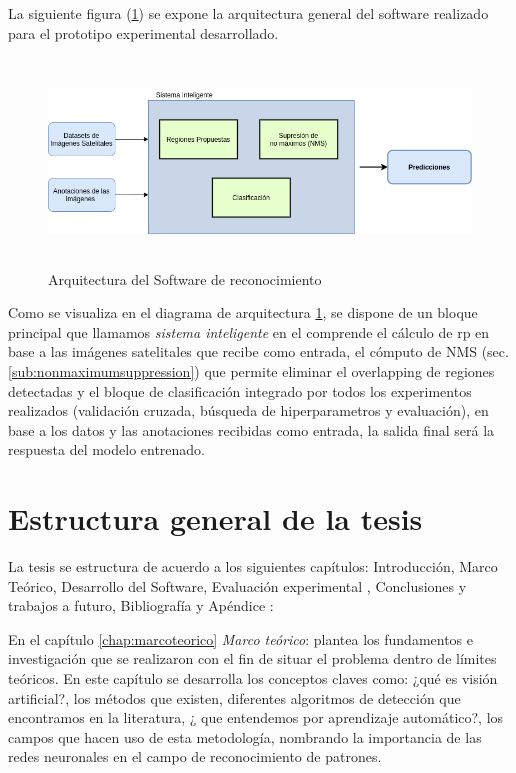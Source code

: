 La siguiente figura (\ref{Fig: diagbloque}) se expone la arquitectura general del software realizado para el prototipo experimental desarrollado. 

\begin{figure}[H]
 \centering
  \includegraphics[height=5.5cm,keepaspectratio=true,clip=true]{imagenes/Logos/DB-Sistema.png}
  \caption{Arquitectura del Software de reconocimiento}
	\label{Fig: diagbloque}
 \end{figure}
 
Como se visualiza en el diagrama de arquitectura \ref{Fig: diagbloque}, se dispone de un bloque principal que llamamos \textit{sistema inteligente} en el comprende el cálculo de \ac{rp} en base a las imágenes satelitales que recibe como entrada, el cómputo de NMS (sec. \ref{sub:nonmaximumsuppression}) que permite eliminar el overlapping de regiones detectadas y el bloque de clasificación integrado por todos los experimentos realizados (validación cruzada, búsqueda de hiperparametros y evaluación), en base a los datos y las anotaciones recibidas como entrada, la salida final será la respuesta del modelo entrenado.

\section{Estructura general de la tesis }\label{sec:estructura}


La tesis se estructura de acuerdo a los siguientes capítulos: Introducción, Marco Teórico, Desarrollo del Software, Evaluación experimental , Conclusiones y trabajos a futuro, Bibliografía y Apéndice :

En el capítulo \ref{chap:marcoteorico} \textit{Marco teórico}: plantea los fundamentos e investigación que se realizaron con el fin de situar el problema dentro de límites teóricos. En este capítulo se desarrolla los conceptos claves como: ¿qué es visión artificial?, los métodos que existen, diferentes algoritmos de detección que encontramos en la literatura, ¿ que entendemos por aprendizaje automático?, los campos que hacen uso de esta metodología, nombrando la importancia de las redes neuronales en el campo de reconocimiento de patrones.

